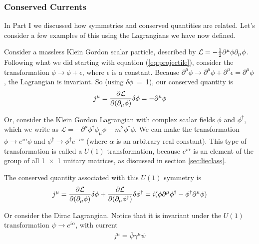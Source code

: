 \documentclass[12pt,epsf]{article}
\def\nolabel{\nonumber }
\def\nolabel{\nonumber }
\begin{document}
\subsubsection{Conserved Currents}
\label{sec:conservedcurrents}

In Part I we discussed how symmetries and conserved quantities are
related.  Let's consider a few examples of this using the Lagrangians
we have now defined.  

Consider a massless Klein Gordon scalar particle, described by
$\mathcal{L} = -{1\over 2} \partial^{\mu}\phi \partial_{\mu}\phi$. 
Following what we did starting with equation (\ref{eq:projectile}),
consider the transformation $\phi \rightarrow \phi+\epsilon$, where
$\epsilon$ is a constant.  Because $\partial^{\mu}\phi \rightarrow
\partial^{\mu}\phi + \partial^{\mu} \epsilon = \partial^{\mu} \phi$,
the Lagrangian is invariant.  So (using $\delta \phi$~=~1), our
conserved quantity is 
\begin{eqnarray}
j^{\mu} = {\partial \mathcal{L} \over \partial (\partial_{\mu} \phi)}
\delta \phi = -\partial^{\mu} \phi\nolabel
\end{eqnarray}

Or, consider the Klein Gordon Lagrangian with complex scalar fields
$\phi$ and $\phi^{\dagger}$, which we write as $\mathcal{L} =
-\partial^{\mu}\phi^{\dagger}\phi_{\mu}\phi - m^2 \phi^{\dagger}\phi$. 
We can make the transformation $\phi \rightarrow e^{i\alpha}\phi$ and
$\phi^{\dagger} \rightarrow \phi^{\dagger}e^{-i\alpha}$ (where $\alpha$
is an arbitrary real constant).  This type of transformation is called
a $U(1)$ transformation, because $e^{i\alpha}$ is an element of the
group of all 1~$\times$~1 unitary matrices, as discussed in section
\ref{sec:lieclass}.  

The conserved quantity associated with this $U(1)$ symmetry is 
\begin{eqnarray}
j^{\mu} = {\partial \mathcal{L} \over \partial (\partial_{\mu}
\phi)}\delta \phi + {\partial \mathcal{L} \over \partial
(\partial_{\mu}\phi^{\dagger})}\delta \phi^{\dagger} = i (\phi
\partial^{\mu}\phi^{\dagger} - \phi^{\dagger} \partial^{\mu}
\phi)\nolabel
\end{eqnarray}

Or consider the Dirac Lagrangian.  Notice that it is invariant under
the $U(1)$ transformation $\psi \rightarrow e^{i\alpha}$, with current 
\begin{eqnarray}
j^{\mu} = \bar \psi \gamma^{\mu} \psi \label{eq:u1current}
\end{eqnarray}
\end{document}
